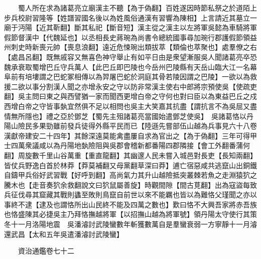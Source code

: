 　　蜀人所在求為諸葛亮立廟漢主不聽【為于偽翻】百姓遂因時節私祭之於道陌上步兵校尉習隆等【姓譜習國名後以為姓風俗通漢有習響為陳相】上言請近其墓立一廟于沔陽【近其靳翻】斷其私祀【斷音短】漢主從之漢主以左將軍吳懿為車騎將軍假節督漢中【代魏延也】以丞相長史蔣琬為尚書令總統國事尋加琬行郡護假節領益州刺史時新喪元帥【喪息浪翻】遠近危悚琬出類拔萃【類倫也萃聚也】處羣僚之右【處昌呂翻】既無戚容又無喜色神守舉止有如平日由是衆望漸服吳人聞諸葛亮卒恐魏承衰取蜀增巴丘守兵萬人【此巴丘即巴陵也今岳州巴陵縣有天岳山臨大江一名幕阜前有培塿謂之巴蛇冢相傳以為羿屠巴蛇於洞庭其骨若陵因謂之巴陵】一欲以為救援二欲以事分割漢人聞之亦增永安之守以防非常漢主使右中郎將宗預使吳【使疏吏翻】吳主問曰東之與西譬猶一家而聞西更增白帝之守何也對曰臣以為東益巴丘之戍西增白帝之守皆事埶宜然俱不足以相問也吳主大笑嘉其抗盡【謂抗言不為吳屈又盡情無所隱也】禮之亞於鄧芝【蜀先主殂諸葛亮當國始遣鄧芝使吳】　吳諸葛恪以丹陽山險民多果勁雖前發兵徒得外縣平民而已【陸遜先嘗部伍山越為兵事見六十八卷漢獻帝建安二十四年】其餘深遠莫能禽盡屢自求為官出之【為于偽翻】三年可得甲士四萬衆議咸以為丹陽地埶險阻與吳郡會稽新都番陽四郡隣接【會工外翻番蒲何翻】周旋數千里山谷萬重【重直龍翻】其幽邃人民未嘗入城邑對長吏【長知兩翻】皆仗兵野逸白首於林莽【莽莫補翻又母黨翻草深曰莽】逋亡宿惡咸共逃竄山出銅鐵自鑄甲兵俗好武習戰【好呼到翻】高尚氣力其升山越險抵突叢棘若魚之走淵猿狖之騰木也【走音奏狖余救翻說文曰狖鼠屬善旋】時觀間隙【間古莧翻】出為寇盜每致兵征伐尋其窟藏其戰則蠭至敗則鳥竄自前世以來不能羈也皆以為難恪父瑾聞之亦以事終不逮【逮及也謂恪所出山民終不能及四萬之數也】歎曰恪不大興吾家將赤吾族也恪盛陳其必捷吳主乃拜恪撫越將軍【以招撫山越為將軍號】領丹陽太守使行其策　冬十一月洛陽地震　吳潘濬討武陵蠻數年斬獲數萬自是羣蠻衰弱一方寧靜十一月濬還武昌【太和五年吳遣潘濬討武陵蠻】

　　資治通鑑卷七十二  
    


 


 



 

 
  







 


　　
　　
　
　
　


　　

　















